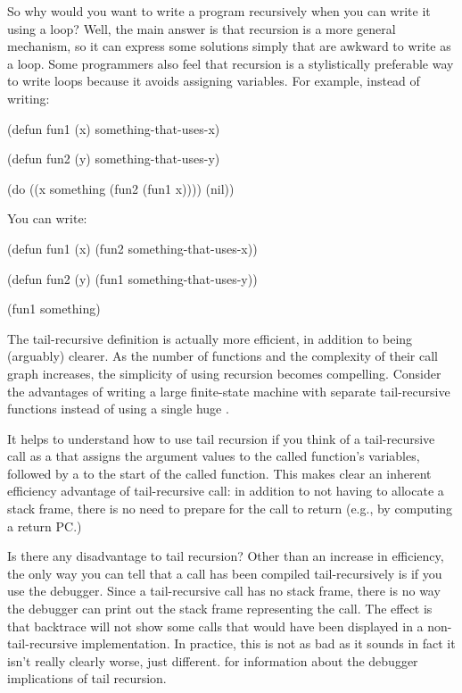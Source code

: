 {So why would you want to write a program recursively when you can write it
using a loop?  Well, the main answer is that recursion is a more general
mechanism, so it can express some solutions simply that are awkward to write as
a loop.  Some programmers also feel that recursion is a stylistically
preferable way to write loops because it avoids assigning variables.
For example, instead of writing:
\begin{lisp}
(defun fun1 (x)
  something-that-uses-x)

(defun fun2 (y)
  something-that-uses-y)

(do ((x something (fun2 (fun1 x))))
    (nil))
\end{lisp}
You can write:
\begin{lisp}
(defun fun1 (x)
  (fun2 something-that-uses-x))

(defun fun2 (y)
  (fun1 something-that-uses-y))

(fun1 something)
\end{lisp}
The tail-recursive definition is actually more efficient, in addition to being
(arguably) clearer.  As the number of functions and the complexity of their
call graph increases, the simplicity of using recursion becomes compelling.
Consider the advantages of writing a large finite-state machine with separate
tail-recursive functions instead of using a single huge .

It helps to understand how to use tail recursion if you think of a
tail-recursive call as a  that assigns the argument values to the
called function's variables, followed by a  to the start of the called
function.  This makes clear an inherent efficiency advantage of tail-recursive
call: in addition to not having to allocate a stack frame, there is no need to
prepare for the call to return (e.g., by computing a return PC.)

Is there any disadvantage to tail recursion?  Other than an increase in
efficiency, the only way you can tell that a call has been compiled
tail-recursively is if you use the debugger.  Since a tail-recursive call has
no stack frame, there is no way the debugger can print out the stack frame
representing the call.  The effect is that backtrace will not show some calls
that would have been displayed in a non-tail-recursive implementation.  In
practice, this is not as bad as it sounds \dash{} in fact it isn't really clearly
worse, just different.   for information
about the debugger implications of tail recursion.

}
